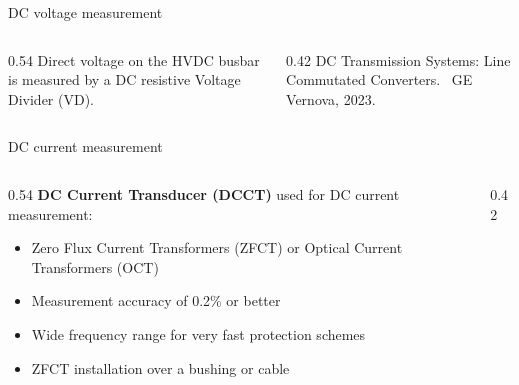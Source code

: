 \begin{frame}{DC voltage measurement}
  \begin{columns}[c,onlytextwidth]
    \begin{column}{0.54\textwidth}
      Direct voltage on the HVDC busbar is measured by a DC resistive
      Voltage Divider (VD).

      \vspace{0.5em}
    \end{column}
    \begin{column}{0.42\textwidth}
      \centering
      {\color{atGray}\footnotesize DC Transmission Systems: Line Commutated Converters. \textcopyright\ GE Vernova, 2023.}      
    \end{column}
  \end{columns}
\end{frame}

\begin{frame}{DC current measurement}
  \begin{columns}[c,onlytextwidth]
    \begin{column}{0.54\textwidth}
      \textbf{DC Current Transducer (DCCT)} used for DC current measurement:
      \begin{itemize}
        \setlength{\itemsep}{0.35em}
        \item Zero Flux Current Transformers (ZFCT) or Optical Current Transformers (OCT)
        \item Measurement accuracy of 0.2\% or better
        \item Wide frequency range for very fast protection schemes
        \item ZFCT installation over a bushing or cable
      \end{itemize}
    \end{column}
    \begin{column}{0.42\textwidth}
      \centering
    \end{column}
  \end{columns}
\end{frame}
